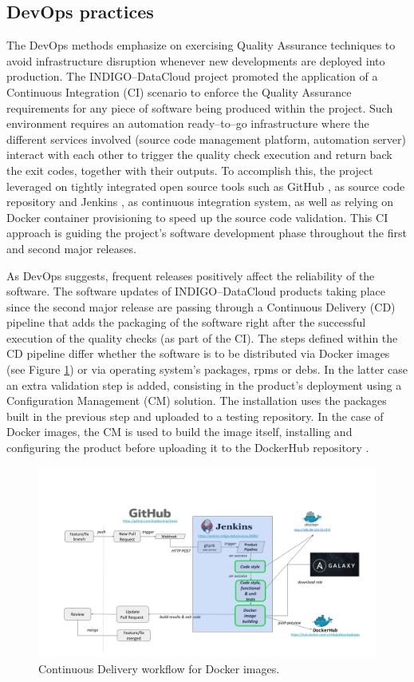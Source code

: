 \documentclass[journal]{IEEEtran}
\begin{document}
\subsection{DevOps practices}
\label{sec:devops}

The DevOps methods emphasize on exercising Quality Assurance techniques to
avoid infrastructure disruption whenever new developments are deployed into
production. The INDIGO--DataCloud project promoted the application of a 
Continuous Integration (CI) scenario to enforce the Quality Assurance requirements 
for any piece of software being produced within the project. Such environment 
requires an automation ready--to--go infrastructure where the different services involved
(source code management platform, automation server) interact with each other
to trigger the quality check execution and return back the exit codes, together
with their outputs. To accomplish this, the project leveraged on tightly
integrated open source tools such as GitHub \cite{github}, as source code repository
and Jenkins \cite{jenkins}, as continuous integration system, as well as relying on
Docker container provisioning to speed up the source code validation. This CI
approach is guiding the project’s software development phase throughout the
first and second major releases.

As DevOps suggests, frequent releases positively affect the reliability of the
software. The software updates of INDIGO--DataCloud products taking place since
the second major release are passing through a Continuous Delivery (CD)
pipeline that adds the packaging of the software right after the successful execution of
the quality checks (as part of the CI). 
The steps defined within the CD pipeline differ whether the software is to be distributed via Docker
images (see Figure \ref{fig:fig_CD}) or via operating system’s packages, rpms or debs. In the latter case an extra
validation step is added, consisting in the product’s deployment using a
Configuration Management (CM) solution. The installation uses the packages
built in the previous step and uploaded to a testing
repository. In the case of Docker images, the CM is used to build the image
itself, installing and configuring the product before uploading it to the
DockerHub repository \cite{indigo-dockerhub}. 


\begin{figure}[ht]
\centering
\includegraphics[width=\textwidth]{images/devops.png}
\caption{Continuous Delivery workflow for Docker images.}
\label{fig:fig_CD}
\end{figure}
\end{document}
